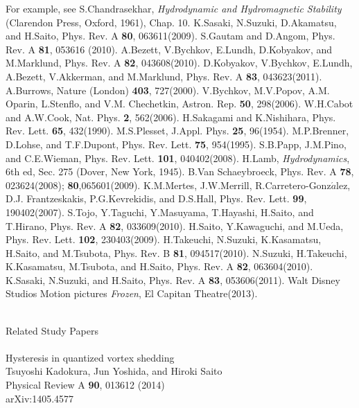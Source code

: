 \documentclass[12pt,a4paper]{report}
\begin{document}
\begin{thebibliography}{81}
 For example, see S.Chandrasekhar, {\it Hydrodynamic and Hydromagnetic Stability} (Clarendon Press, Oxford, 1961), Chap. 10.
 K.Sasaki, N.Suzuki, D.Akamatsu, and H.Saito, Phys. Rev. A {\bf 80}, 063611(2009).
 S.Gautam and D.Angom, Phys. Rev. A {\bf 81}, 053616 (2010).
 A.Bezett, V.Bychkov, E.Lundh, D.Kobyakov, and M.Marklund, Phys. Rev. A {\bf 82}, 043608(2010).
 D.Kobyakov, V.Bychkov, E.Lundh, A.Bezett, V.Akkerman, and M.Marklund, Phys. Rev. A {\bf 83}, 043623(2011).
 A.Burrows, Nature (London) {\bf 403}, 727(2000).
 V.Bychkov, M.V.Popov, A.M. Oparin, L.Stenflo, and V.M. Chechetkin, Astron. Rep. {\bf 50}, 298(2006).
 W.H.Cabot and A.W.Cook, Nat. Phys. {\bf 2}, 562(2006).
 H.Sakagami and K.Nishihara, Phys. Rev. Lett. {\bf 65}, 432(1990).
 M.S.Plesset, J.Appl. Phys. {\bf 25}, 96(1954).
 M.P.Brenner, D.Lohse, and T.F.Dupont, Phys. Rev. Lett. {\bf 75}, 954(1995).
 S.B.Papp, J.M.Pino, and C.E.Wieman, Phys. Rev. Lett. {\bf 101}, 040402(2008).
 H.Lamb, {\it Hydrodynamics}, 6th ed, Sec. 275 (Dover, New York, 1945).
 B.Van Schaeybroeck, Phys. Rev. A {\bf 78}, 023624(2008); {\bf 80},065601(2009).
 K.M.Mertes, J.W.Merrill, R.Carretero-Gonz$\acute{a}$lez, D.J. Frantzeskakis, P.G.Kevrekidis, and D.S.Hall, Phys. Rev. Lett. {\bf 99}, 190402(2007).
 S.Tojo, Y.Taguchi, Y.Masuyama, T.Hayashi, H.Saito, and T.Hirano, Phys. Rev. A {\bf 82}, 033609(2010).
 H.Saito, Y.Kawaguchi, and M.Ueda, Phys. Rev. Lett. {\bf 102}, 230403(2009).
 H.Takeuchi, N.Suzuki, K.Kasamatsu, H.Saito, and M.Tsubota, Phys. Rev. B {\bf 81}, 094517(2010).
 N.Suzuki, H.Takeuchi, K.Kasamatsu, M.Tsubota, and H.Saito, Phys. Rev. A {\bf 82}, 063604(2010).
 K.Sasaki, N.Suzuki, and H.Saito, Phys. Rev. A {\bf 83}, 053606(2011).
 Walt Disney Studios Motion pictures {\it Frozen}, El Capitan Theatre(2013).
\end{thebibliography}
\newpage
\ 
\\
Related Study Papers
\\
\\
Hysteresis in quantized vortex shedding
\\
Tsuyoshi Kadokura, Jun Yoshida, and Hiroki Saito
\\
Physical Review A {\bf 90}, 013612 (2014)
\\
arXiv:1405.4577
\end{document}
